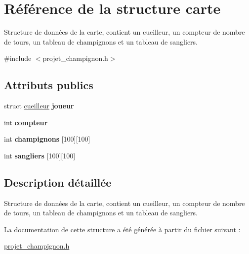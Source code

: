 \hypertarget{structcarte}{}\section{Référence de la structure carte}
\label{structcarte}


Structure de données de la carte, contient un cueilleur, un compteur de nombre de tours, un tableau de champignons et un tableau de sangliers.  




{\ttfamily \#include $<$projet\+\_\+champignon.\+h$>$}

\subsection*{Attributs publics}
\begin{DoxyCompactItemize}
\item 
\hypertarget{structcarte_ac3e1886de48dd33100916e10bd12c3c8}{}\label{structcarte_ac3e1886de48dd33100916e10bd12c3c8} 
struct \hyperlink{structcueilleur}{cueilleur} {\bfseries joueur}
\item 
\hypertarget{structcarte_a667883344ad4c184b3ca96f9879c2396}{}\label{structcarte_a667883344ad4c184b3ca96f9879c2396} 
int {\bfseries compteur}
\item 
\hypertarget{structcarte_a6f3f3d122ea5e028d49aa6cb4d35f728}{}\label{structcarte_a6f3f3d122ea5e028d49aa6cb4d35f728} 
int {\bfseries champignons} \mbox{[}100\mbox{]}\mbox{[}100\mbox{]}
\item 
\hypertarget{structcarte_acca3a3abad3065e9222b28a757cce9d5}{}\label{structcarte_acca3a3abad3065e9222b28a757cce9d5} 
int {\bfseries sangliers} \mbox{[}100\mbox{]}\mbox{[}100\mbox{]}
\end{DoxyCompactItemize}


\subsection{Description détaillée}
Structure de données de la carte, contient un cueilleur, un compteur de nombre de tours, un tableau de champignons et un tableau de sangliers. 

La documentation de cette structure a été générée à partir du fichier suivant \+:\begin{DoxyCompactItemize}
\item 
\hyperlink{projet__champignon_8h}{projet\+\_\+champignon.\+h}\end{DoxyCompactItemize}
